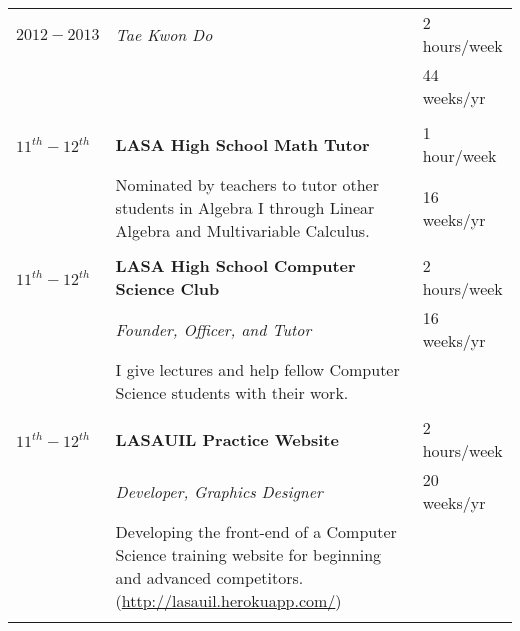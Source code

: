 \documentclass{article}
\begin{document}
\begin{tabularx}{\textwidth - 20pt}{@{}l X l}
		$2012 - 2013$ & \emph{Tae Kwon Do} & 2 hours/week\\
		& & 44 weeks/yr\\
		\\ 
		$11^{th} - 12^{th}$ & \textbf{LASA High School Math Tutor} & 1 hour/week\\
		& Nominated by teachers to tutor other students in Algebra I through Linear Algebra and Multivariable Calculus. & 16 weeks/yr\\
		\\ 
		$11^{th} - 12^{th}$ & \textbf{LASA High School Computer Science Club} & 2 hours/week\\
		& \emph{Founder, Officer, and Tutor} & 16 weeks/yr\\
		& I give lectures and help fellow Computer Science students with their work. & \\
		\\
		$11^{th} - 12^{th}$ & \textbf{LASAUIL Practice Website} & 2 hours/week\\
		& \emph{Developer, Graphics Designer} & 20 weeks/yr\\
		& Developing the front-end of a Computer Science training website for beginning and advanced competitors. (\url{http://lasauil.herokuapp.com/}) & \\
		\\
	\end{tabularx}
	\newpage
	\vspace*{4 mm}
\end{document}
